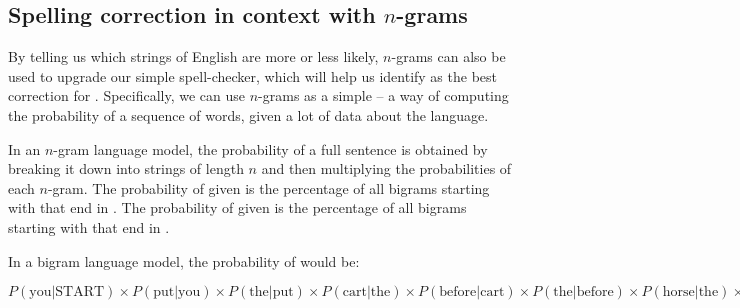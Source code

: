 \subsection{Spelling correction in context with $n$-grams} \label{correction-with-ngrams}

By telling us which strings of English are more or less likely, $n$-grams can also be used to upgrade our simple spell-checker, which will help us  identify  as the best correction for .  Specifically, we can use $n$-grams as a simple  --  a way of computing the probability of a sequence of words, given a lot of data about the language.

In an $n$-gram language model, the probability of a full sentence is obtained by breaking it down into strings of length $n$ and then multiplying the probabilities of each $n$-gram.  
The probability of  given  is the percentage of all bigrams starting with  that end in .  The probability of  given  is the percentage of all bigrams starting with  that end in .
 

In a bigram language model, the probability of  would be: 

\ea  \label{ex:bi-correct} $P(\mbox{you}|\mbox{START}) \times
  P(\mbox{put}|\mbox{you}) \times P(\mbox{the}|\mbox{put}) \times P(\mbox{cart}|\mbox{the}) \times P(\mbox{before}|\mbox{cart}) \times P(\mbox{the}|\mbox{before}) \times P(\mbox{horse}|\mbox{the}) \times
  P(\mbox{END}|\mbox{horse})$
  \z 

